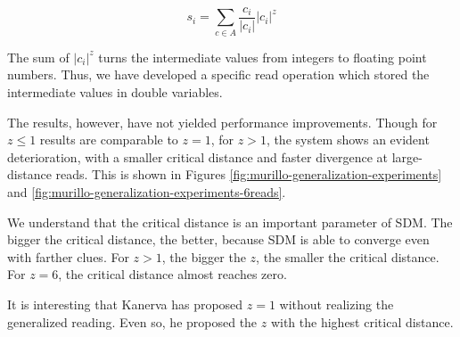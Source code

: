 $$
s_i = \sum_{c \in A} \frac{c_i}{|c_i|} |c_i|^z
$$

The sum of $|c_i|^z$ turns the intermediate values from integers to floating point numbers. Thus, we have developed a specific read operation which stored the intermediate values in double variables.

The results, however, have not yielded performance improvements. Though for $z \leq 1$ results are comparable to $z=1$, for $z>1$, the system shows an evident deterioration, with a smaller critical distance and faster divergence at large-distance reads. This is shown in Figures \ref{fig:murillo-generalization-experiments} and \ref{fig:murillo-generalization-experiments-6reads}.

We understand that the critical distance is an important parameter of SDM. The bigger the critical distance, the better, because SDM is able to converge even with farther clues. For $z>1$, the bigger the $z$, the smaller the critical distance. For $z = 6$, the critical distance almost reaches zero.

It is interesting that Kanerva has proposed $z=1$ without realizing the generalized reading. Even so, he proposed the $z$ with the highest critical distance.

